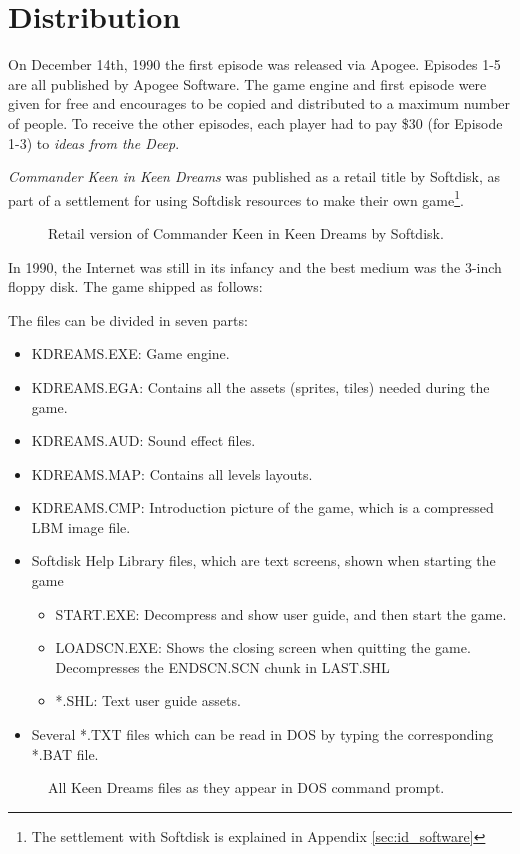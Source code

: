 \documentclass[book.tex]{subfiles}
\begin{document}
\section{Distribution}
On December 14th, 1990 the first episode was released via Apogee. Episodes 1-5 are all published by Apogee Software. The game engine and first episode were given for free and encourages to be copied and distributed to a maximum number of people. To receive the other episodes, each player had to pay \$30 (for Episode 1-3) to \textit{ideas from the Deep}.\\

\par
\textit{Commander Keen in Keen Dreams} was published as a retail title by Softdisk, as part of a settlement for using Softdisk resources to make their own game\footnote{The settlement with Softdisk is explained in Appendix \ref{sec:id_software}}.\\

\par
\begin{figure}[H]
\centering
{}
\caption{Retail version of Commander Keen in Keen Dreams by Softdisk.}
\end{figure}
\par


In 1990, the Internet was still in its infancy and the best medium was the 3-inch floppy disk. The game shipped as follows:\\

  \par
 The files can be divided in seven parts:
\begin{itemize}
 \item KDREAMS.EXE: Game engine.
 \item KDREAMS.EGA: Contains all the assets (sprites, tiles) needed during the game.
 \item KDREAMS.AUD: Sound effect files.
 \item KDREAMS.MAP: Contains all levels layouts.
 \item KDREAMS.CMP: Introduction picture of the game, which is a compressed LBM image file.
 \item Softdisk Help Library files, which are text screens, shown when starting the game
 \begin{itemize}
   \item START.EXE: Decompress and show user guide, and then start the game.
   \item LOADSCN.EXE: Shows the closing screen when quitting the game. Decompresses the ENDSCN.SCN chunk in LAST.SHL
   \item *.SHL: Text user guide assets. 
 \end{itemize}
 \item Several *.TXT files which can be read in DOS by typing the corresponding *.BAT file. 

\end{itemize}

\par
 \begin{figure}[H]
\centering
 \caption{All Keen Dreams files as they appear in DOS command prompt.}
  \end{figure}
 \par
\end{document}
